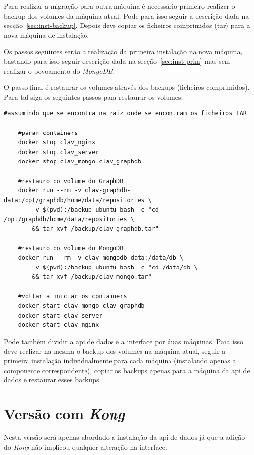 Para realizar a migração para outra máquina é necessário primeiro realizar o backup dos volumes da máquina atual. Pode para isso seguir a descrição dada na secção~\ref{sec:inst-backup}. Depois deve copiar os ficheiros comprimidos (\acrshort{tar}) para a nova máquina de instalação.

Os passos seguintes serão a realização da primeira instalação na nova máquina, bastando para isso seguir descrição dada na secção~\ref{sec:inst-prim} mas sem realizar o povoamento do \textit{MongoDB}.

O passo final é restaurar os volumes através dos backups (ficheiros comprimidos). Para tal siga os seguintes passos para restaurar os volumes:
\begin{lstlisting}[caption=Restauro dos volumes do \textit{docker}]
    #assumindo que se encontra na raiz onde se encontram os ficheiros TAR

    #parar containers
    docker stop clav_nginx
    docker stop clav_server
    docker stop clav_mongo clav_graphdb
    
    #restauro do volume do GraphDB
    docker run --rm -v clav-graphdb-data:/opt/graphdb/home/data/repositories \
        -v $(pwd):/backup ubuntu bash -c "cd /opt/graphdb/home/data/repositories \
        && tar xvf /backup/clav_graphdb.tar"
        
    #restauro do volume do MongoDB
    docker run --rm -v clav-mongodb-data:/data/db \
        -v $(pwd):/backup ubuntu bash -c "cd /data/db \
        && tar xvf /backup/clav_mongo.tar"
        
    #voltar a iniciar os containers
    docker start clav_mongo clav_graphdb
    docker start clav_server
    docker start clav_nginx
\end{lstlisting}

Pode também dividir a \acrshort{api} de dados e a interface por duas máquinas. Para isso deve realizar na mesma o backup dos volumes na máquina atual, seguir a primeira instalação individualmente para cada máquina (instalando apenas a componente correspondente), copiar os backups apenas para a máquina da \acrshort{api} de dados e restaurar esses backups.

\section{Versão com \textit{Kong}}\label{sec:deployKong}

Nesta versão será apenas abordado a instalação da \acrshort{api} de dados já que a adição do \textit{Kong} não implicou qualquer alteração na interface.

